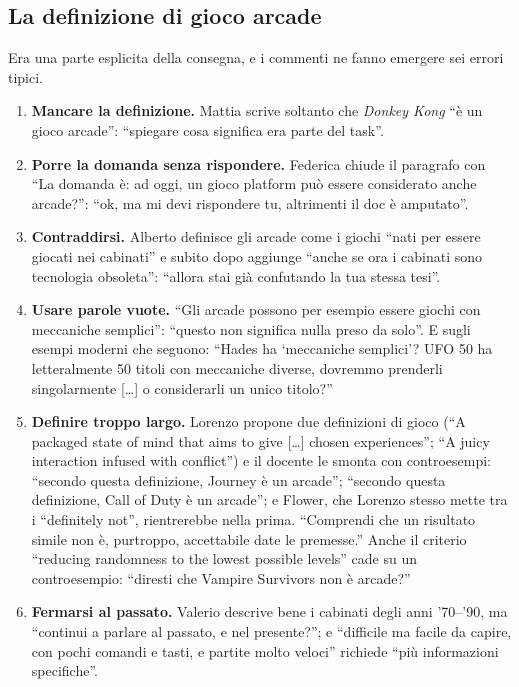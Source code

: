 \subsection{La definizione di gioco arcade}
\label{rv:t1:sec:arcade}

Era una parte esplicita della consegna, e i commenti ne fanno emergere sei
errori tipici.
\begin{enumerate}
  \item \textbf{Mancare la definizione.} Mattia scrive soltanto che
        \emph{Donkey Kong} ``è un gioco arcade'': ``spiegare cosa significa
        era parte del task''.
  \item \textbf{Porre la domanda senza rispondere.} Federica chiude il
        paragrafo con ``La domanda è: ad oggi, un gioco platform può essere
        considerato anche arcade?'': ``ok, ma mi devi rispondere tu,
        altrimenti il doc è amputato''.
  \item \textbf{Contraddirsi.} Alberto definisce gli arcade come i giochi
        ``nati per essere giocati nei cabinati'' e subito dopo aggiunge
        ``anche se ora i cabinati sono tecnologia obsoleta'': ``allora stai
        già confutando la tua stessa tesi''.
  \item \textbf{Usare parole vuote.} ``Gli arcade possono per esempio essere
        giochi con meccaniche semplici'': ``questo non significa nulla preso
        da solo''. E sugli esempi moderni che seguono: ``Hades ha
        `meccaniche semplici'? UFO 50 ha letteralmente 50 titoli con
        meccaniche diverse, dovremmo prenderli singolarmente [\dots] o
        considerarli un unico titolo?''
  \item \textbf{Definire troppo largo.} Lorenzo propone due definizioni di
        gioco (``A packaged state of mind that aims to give [\dots] chosen
        experiences''; ``A juicy interaction infused with conflict'') e il
        docente le smonta con controesempi: ``secondo questa definizione,
        Journey è un arcade''; ``secondo questa definizione, Call of Duty è
        un arcade''; e Flower, che Lorenzo stesso mette tra i ``definitely
        not'', rientrerebbe nella prima. ``Comprendi che un risultato simile
        non è, purtroppo, accettabile date le premesse.'' Anche il criterio
        ``reducing randomness to the lowest possible levels'' cade su un
        controesempio: ``diresti che Vampire Survivors non è arcade?''
  \item \textbf{Fermarsi al passato.} Valerio descrive bene i cabinati degli
        anni '70--'90, ma ``continui a parlare al passato, e nel presente?'';
        e ``difficile ma facile da capire, con pochi comandi e tasti, e
        partite molto veloci'' richiede ``più informazioni specifiche''.
\end{enumerate}

